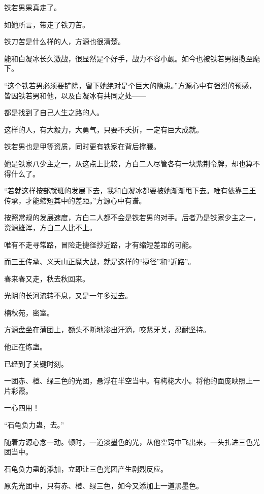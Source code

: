 
\begin{this_body}



铁若男果真走了。

如她所言，带走了铁刀苦。

铁刀苦是什么样的人，方源也很清楚。

能和白凝冰长久激战，很显然是个好手，战力不容小觑。如今也被铁若男招揽至麾下。

“这个铁若男必须要铲除，留下她绝对是个巨大的隐患。”方源心中有强烈的预感，皆因铁若男和他，以及白凝冰有共同之处——

都是找到了自己人生之路的人。

这样的人，有大毅力，大勇气，只要不夭折，一定有巨大成就。

铁若男也是甲等资质，同时更有铁家在背后撑腰。

她是铁家八少主之一，从这点上比较，方白二人尽管各有一块紫荆令牌，却也算不得什么了。

“若就这样按部就班的发展下去，我和白凝冰都要被她渐渐甩下去。唯有依靠三王传承，才能缩短其中的差距。”方源心中有谱。

按照常规的发展速度，方白二人都不会是铁若男的对手。后者乃是铁家少主之一，资源雄浑，方白二人比不上。

唯有不走寻常路，冒险走捷径抄近路，才有缩短差距的可能。

而三王传承、义天山正魔大战，就是这样的“捷径”和“近路”。

春来春又走，秋去秋回来。

光阴的长河流转不息，又是一年多过去。

楠秋苑，密室。

方源盘坐在蒲团上，额头不断地渗出汗滴，咬紧牙关，忍耐坚持。

他正在炼蛊。

已经到了关键时刻。

一团赤、橙、绿三色的光团，悬浮在半空当中。有栲栳大小。将他的面庞映照上一片彩霞。

一心四用！

“石龟负力蛊，去。”

随着方源心念一动。顿时，一道淡墨色的光，从他空窍中飞出来，一头扎进三色光团当中。

石龟负力蛊的添加，立即让三色光团产生剧烈反应。

原先光团中，只有赤、橙、绿三色，如今又添加上一道黑墨色。


\end{this_body}
